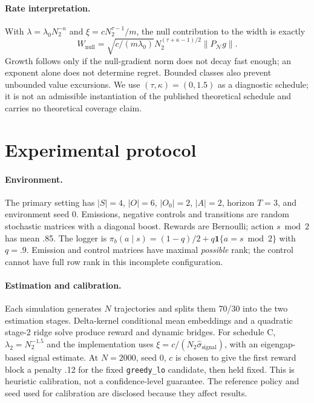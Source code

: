 \documentclass[11pt]{article}
\newcommand{\Pn}{P_{\mathcal N}}
\begin{document}
\paragraph{Rate interpretation.}
With $\lambda=\lambda_0 N_2^{-\kappa}$ and
$\xi=cN_2^{\tau-1}/m$, the null contribution to the width is exactly
\begin{equation}
 W_{\mathrm{null}}=\sqrt{c/(m\lambda_0)}
 N_2^{(\tau+\kappa-1)/2}\|\Pn g\|.
\end{equation}
Growth follows only if the null-gradient norm does not decay fast enough;
an exponent alone does not determine regret. Bounded classes also prevent
unbounded value excursions. We use $(\tau,\kappa)=(0,1.5)$ as a diagnostic
schedule; it is not an admissible instantiation of the published theoretical
schedule and carries no theoretical coverage claim.

\section{Experimental protocol}
\paragraph{Environment.}
The primary setting has $|S|=4$, $|O|=6$, $|O_0|=2$, $|A|=2$, horizon $T=3$,
and environment seed 0. Emissions, negative controls and transitions are
random stochastic matrices with a diagonal boost. Rewards are Bernoulli;
action $s\bmod2$ has mean .85. The logger is
$\pi_b(a\mid s)=(1-q)/2+q\mathbf1\{a=s\bmod2\}$ with $q=.9$.
Emission and control matrices have maximal \emph{possible} rank; the control
cannot have full row rank in this incomplete configuration.

\paragraph{Estimation and calibration.}
Each simulation generates $N$ trajectories and splits them 70/30 into the two
estimation stages. Delta-kernel conditional mean embeddings and a quadratic
stage-2 ridge solve produce reward and dynamic bridges. For schedule C,
$\lambda_2=N_2^{-1.5}$ and the implementation uses
$\xi=c/(N_2\hat\sigma_{\mathrm{signal}})$, with an eigengap-based signal
estimate. At $N=2000$, seed 0, $c$ is chosen to give the first reward block
a penalty .12 for the fixed \texttt{greedy\_lo} candidate, then held fixed.
This is heuristic calibration, not a confidence-level guarantee. The reference
policy and seed used for calibration are disclosed because they affect results.
\end{document}
